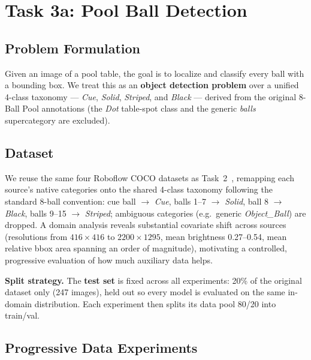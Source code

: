 \documentclass[conference, 10pt]{IEEEtran}
\begin{document}

\section{Task 3a: Pool Ball Detection}

\subsection{Problem Formulation}

Given an image of a pool table, the goal is to localize and classify every ball with a bounding box.
We treat this as an \textbf{object detection problem} over a unified 4-class taxonomy --- \textit{Cue}, \textit{Solid}, \textit{Striped}, and \textit{Black} --- derived from the original 8-Ball Pool annotations (the \textit{Dot} table-spot class and the generic \textit{balls} supercategory are excluded).

\subsection{Dataset}

We reuse the same four Roboflow COCO datasets as Task~2~\cite{ds_8ballpool,ds_poolbilliard,ds_poolballsdetection,ds_poolballdetection}, remapping each source's native categories onto the shared 4-class taxonomy following the standard 8-ball convention: cue ball $\rightarrow$ \textit{Cue}, balls 1--7 $\rightarrow$ \textit{Solid}, ball 8 $\rightarrow$ \textit{Black}, balls 9--15 $\rightarrow$ \textit{Striped}; ambiguous categories (e.g.\ generic \textit{Object\_Ball}) are dropped.
A domain analysis reveals substantial covariate shift across sources (resolutions from $416\times416$ to $2200\times1295$, mean brightness 0.27--0.54, mean relative bbox area spanning an order of magnitude), motivating a controlled, progressive evaluation of how much auxiliary data helps.

\textbf{Split strategy.} The \textbf{test set} is fixed across all experiments: 20\% of the original dataset only (247 images), held out so every model is evaluated on the same in-domain distribution. Each experiment then splits its data pool 80/20 into train/val.

\subsection{Progressive Data Experiments}
\end{document}

